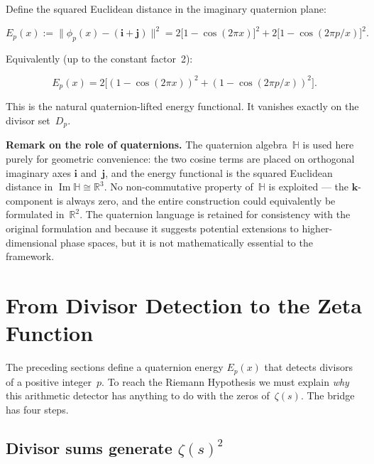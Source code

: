 \documentclass[12pt,a4paper]{article}
\newcommand{\HH}{\mathbb{H}}
\newcommand{\RR}{\mathbb{R}}
\newcommand{\ii}{\mathbf{i}}
\newcommand{\jj}{\mathbf{j}}
\newcommand{\kk}{\mathbf{k}}
\begin{document}
Define the squared Euclidean distance in the imaginary quaternion plane:

\begin{mathblock}
\[
E_p(x) := \|\phi_p(x) - (\ii + \jj)\|^2 = 2\bigl[1 - \cos(2\pi x)\bigr]^2 + 2\bigl[1 - \cos(2\pi p/x)\bigr]^2.
\]
\end{mathblock}

\noindent Equivalently (up to the constant factor~2):

\begin{mathblock}
\[
E_p(x) = 2 \bigl[ (1 - \cos(2\pi x))^2 + (1 - \cos(2\pi p/x))^2 \bigr].
\]
\end{mathblock}

\noindent This is the natural quaternion-lifted energy functional. It vanishes exactly on the divisor set~$D_p$.

\begin{definitionbox}
\textbf{Remark on the role of quaternions.} The quaternion algebra~$\HH$ is used here purely for geometric convenience: the two cosine terms are placed on orthogonal imaginary axes $\ii$ and~$\jj$, and the energy functional is the squared Euclidean distance in $\operatorname{Im}\HH \cong \RR^3$. No non-commutative property of~$\HH$ is exploited --- the $\kk$-component is always zero, and the entire construction could equivalently be formulated in~$\RR^2$. The quaternion language is retained for consistency with the original formulation and because it suggests potential extensions to higher-dimensional phase spaces, but it is not mathematically essential to the framework.
\end{definitionbox}

\section{From Divisor Detection to the Zeta Function}
\label{sec:bridge}

The preceding sections define a quaternion energy $E_p(x)$ that detects divisors of a positive integer~$p$. To reach the Riemann Hypothesis we must explain \emph{why} this arithmetic detector has anything to do with the zeros of~$\zeta(s)$. The bridge has four steps.

\subsection{Divisor sums generate \texorpdfstring{$\zeta(s)^2$}{zeta(s)\textasciicircum 2}}
\end{document}
